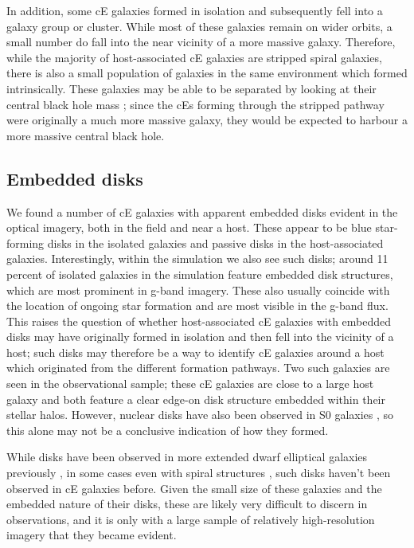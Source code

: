 \documentclass[a4paper,fleqn,usenatbib]{mnras}
\begin{document}
In addition, some cE galaxies formed in isolation and subsequently fell into a galaxy group or cluster. While most of these galaxies remain on wider orbits, a small number do fall into the near vicinity of a more massive galaxy. Therefore, while the majority of host-associated cE galaxies are stripped spiral galaxies, there is also a small population of galaxies in the same environment which formed intrinsically. These galaxies may be able to be separated by looking at their central black hole mass \citep{2021ApJ...917L...9R}; since the cEs forming through the stripped pathway were originally a much more massive galaxy, they would be expected to harbour a more massive central black hole. 

\subsection{Embedded disks}

We found a number of cE galaxies with apparent embedded disks evident in the optical imagery, both in the field and near a host. These appear to be blue star-forming disks in the isolated galaxies and passive disks in the host-associated galaxies. Interestingly, within the simulation we also see such disks; around 11 percent of isolated galaxies in the simulation feature embedded disk structures, which are most prominent in g-band imagery. These also usually coincide with the location of ongoing star formation and are most visible in the g-band flux. This raises the question of whether host-associated cE galaxies with embedded disks may have originally formed in isolation and then fell into the vicinity of a host; such disks may therefore be a way to identify cE galaxies around a host which originated from the different formation pathways.  Two such galaxies are seen in the observational sample; these cE galaxies are close to a large host galaxy and both feature a clear edge-on disk structure embedded within their stellar halos. However, nuclear disks have also been observed in S0 galaxies \citep{2002ApJ...573..131P}, so this alone may not be a conclusive indication of how they formed. 

While disks have been observed in more extended dwarf elliptical galaxies previously \citep{2003A&A...400..119D}, in some cases even with spiral structures \citep{2000A&A...358..845J}, such disks haven't  been observed in cE galaxies before. Given the small size of these galaxies and the embedded nature of their disks, these are likely very difficult to discern in observations, and it is only with a large sample of relatively high-resolution imagery that they became evident. 
\end{document}
